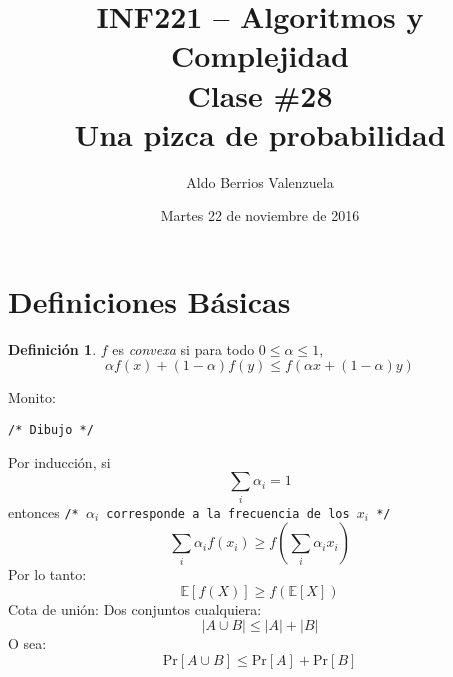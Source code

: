 \documentclass[english, spanish, fleqn, 10pt]{article}
\author{Aldo Berrios Valenzuela}
\title{INF221 -- Algoritmos y Complejidad\\[.4\baselineskip]
Clase \#28\\
Una pizca de probabilidad}
\date{Martes 22 de noviembre de 2016}
\newcommand{\comentarioc}[1]{\texttt{\textcolor{webred}{/* #1 */}}}
\numberwithin{equation}{section}
\newcommand{\nparentesis}[1]{\left( #1 \right)}
\newcommand{\nabsoluto}[1]{\left| #1 \right|}
\newcommand{\ncorchetes}[1]{\left[ #1 \right]}
\theoremstyle{definition}
\newtheorem{definition}{Definición}[section]
\newcommand{\esperanza}[1]{\mathbb{E}\ncorchetes{#1}}
\begin{document}
\maketitle
\section{Definiciones Básicas}
\begin{definition}
	$f$ es \emph{convexa} si para todo $0\leq \alpha \leq 1$,
	\begin{equation}
	\alpha f\nparentesis{x} + \nparentesis{1-\alpha} f\nparentesis{y} \leq f\nparentesis{\alpha x + \nparentesis{1-\alpha} y}
	\end{equation}
\end{definition}
	Monito:
	\begin{center}
		\comentarioc{Dibujo}
	\end{center}
	Por inducción, si
	\begin{equation*}
	\sum_i \alpha_i = 1
	\end{equation*}
	entonces \comentarioc{$\alpha_i$ corresponde a la frecuencia de los $x_i$}
	\begin{equation*}
	\sum_i \alpha_i f\nparentesis{x_i} \geq f\nparentesis{\sum_i \alpha_i x_i}
	\end{equation*}
	Por lo tanto:
	\begin{equation}
	\esperanza{f\nparentesis{X}} \geq f\nparentesis{\esperanza{X}}
	\end{equation}
	Cota de unión: Dos conjuntos cualquiera:
	\begin{equation*}
	\nabsoluto{A\cup B} \leq \nabsoluto{A} + \nabsoluto{B}
	\end{equation*}
	O sea:
	\newcommand{\pr}[1]{\mathrm{Pr}\ncorchetes{#1}}
	\begin{equation}
	\pr{A\cup B} \leq \pr{A} + \pr{B}
	\end{equation}
\end{document}
